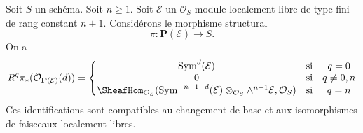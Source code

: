 \begin{lemma}
\label{lemma-cohomology-projective-bundle}
Soit $S$ un schéma. Soit $n \geq 1$.
Soit $\mathcal{E}$
un $\mathcal{O}_S$-module localement libre de type fini de rang constant $n + 1$.
Considérons le morphisme structural
$$
\pi : \mathbf{P}(\mathcal{E}) \longrightarrow S.
$$
On a
$$
R^q\pi_*(\mathcal{O}_{\mathbf{P}(\mathcal{E})}(d)) =
\left\{
\begin{matrix}
\text{Sym}^d(\mathcal{E}) & \text{si} & q = 0 \\
0 & \text{si} & q \not = 0, n \\
\SheafHom_{\mathcal{O}_S}(
\text{Sym}^{- n - 1 - d}(\mathcal{E})
\otimes_{\mathcal{O}_S}
\wedge^{n + 1}\mathcal{E},
\mathcal{O}_S)
& \text{si} & q = n
\end{matrix}
\right.
$$
Ces identifications sont compatibles au changement de base et
aux isomorphismes de faisceaux localement libres.
\end{lemma}

